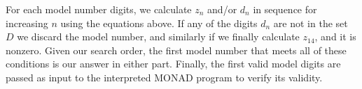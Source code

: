 \documentclass{article}
\begin{document}
{    For each model number digits, we calculate $z_n$ and/or $d_n$ in sequence for increasing $n$ using the equations above.
    If any of the digits $d_n$ are not in the set $D$ we discard the model number, and similarly if we finally calculate $z_{14}$, and it is nonzero.
    Given our search order, the first model number that meets all of these conditions is our answer in either part.
    Finally, the first valid model digits are passed as input to the interpreted MONAD program to verify its validity.
}
\end{document}
